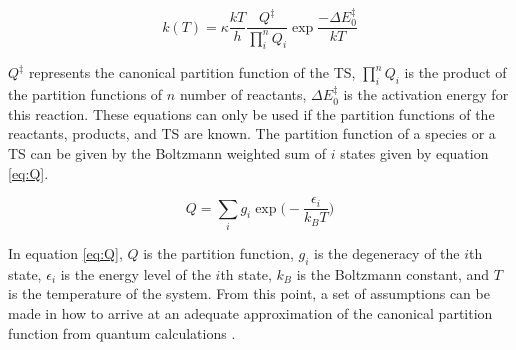 \documentclass[preprint, 11pt]{elsarticle} %
\begin{document}
\begin{equation}
    k(T) = \kappa \frac{k T}{h} \frac{Q^\ddagger}{\prod^{n}_{i} Q_i} \exp{\frac{-\Delta E^{\ddagger}_{0}}{k T}}
    \label{eyring:2}
\end{equation}

$Q^\ddagger$ represents the canonical partition function of the TS, $\prod^n_i Q_i$ is the product of the partition functions of $n$ number of reactants, $\Delta E^{\ddagger}_0$ is the activation energy for this reaction.
These equations can only be used if the partition functions of the reactants, products, and TS are known. 
The partition function of a species or a TS can be given by the Boltzmann weighted sum of $i$ states given by equation \ref{eq:Q}.

\begin{equation}
    Q = \sum_i g_i \exp\Big(-\frac{\epsilon_i}{k_B T})
    \label{eq:Q}
\end{equation}

In equation \ref{eq:Q}, $Q$ is the partition function, $g_i$ is the degeneracy of the $i$th state, $\epsilon_i$ is the energy level of the $i$th state, $k_B$ is the Boltzmann constant, and $T$ is the temperature of the system.
From this point, a set of assumptions can be made in how to arrive at an adequate approximation of the canonical partition function from quantum calculations \cite{Truhlar:1991}.
\end{document}
